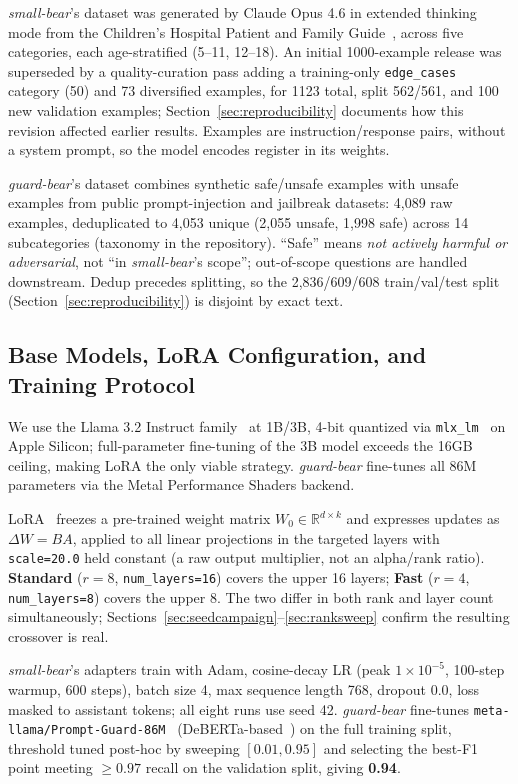 \documentclass[pdflatex,sn-mathphys-num]{sn-jnl-official}%
\begin{document}
\textit{small-bear}'s dataset was generated by Claude Opus 4.6 in extended thinking mode from the Children's Hospital Patient and Family Guide~\cite{hospitalguide}, across five categories, each age-stratified (5--11, 12--18). An initial 1000-example release was superseded by a quality-curation pass adding a training-only \texttt{edge\_cases} category (50) and 73 diversified examples, for 1123 total, split 562/561, and 100 new validation examples; Section~\ref{sec:reproducibility} documents how this revision affected earlier results. Examples are instruction/response pairs, without a system prompt, so the model encodes register in its weights.

\textit{guard-bear}'s dataset combines synthetic safe/unsafe examples with unsafe examples from public prompt-injection and jailbreak datasets: 4{,}089 raw examples, deduplicated to 4{,}053 unique (2{,}055 unsafe, 1{,}998 safe) across 14 subcategories (taxonomy in the repository). ``Safe'' means \textit{not actively harmful or adversarial}, not ``in \textit{small-bear}'s scope''; out-of-scope questions are handled downstream. Dedup precedes splitting, so the 2{,}836/609/608 train/val/test split (Section~\ref{sec:reproducibility}) is disjoint by exact text.

\subsection{Base Models, LoRA Configuration, and Training Protocol}\label{sec:trainprotocol}

We use the Llama 3.2 Instruct family~\cite{dubey2024llama3} at 1B/3B, 4-bit quantized via \texttt{mlx\_lm}~\cite{apple2023mlx} on Apple Silicon; full-parameter fine-tuning of the 3B model exceeds the 16GB ceiling, making LoRA the only viable strategy. \textit{guard-bear} fine-tunes all 86M parameters via the Metal Performance Shaders backend.

LoRA~\cite{hu2022lora} freezes a pre-trained weight matrix $W_0 \in \mathbb{R}^{d\times k}$ and expresses updates as $\Delta W = BA$, applied to all linear projections in the targeted layers with \texttt{scale=20.0} held constant (a raw output multiplier, not an alpha/rank ratio). \textbf{Standard} ($r=8$, \texttt{num\_layers=16}) covers the upper 16 layers; \textbf{Fast} ($r=4$, \texttt{num\_layers=8}) covers the upper 8. The two differ in both rank and layer count simultaneously; Sections~\ref{sec:seedcampaign}--\ref{sec:ranksweep} confirm the resulting crossover is real.

\textit{small-bear}'s adapters train with Adam, cosine-decay LR (peak $1\times10^{-5}$, 100-step warmup, 600 steps), batch size 4, max sequence length 768, dropout 0.0, loss masked to assistant tokens; all eight runs use seed 42. \textit{guard-bear} fine-tunes \texttt{meta-llama/Prompt-Guard-86M}~\cite{promptguard2024} (DeBERTa-based~\cite{he2021deberta}) on the full training split, threshold tuned post-hoc by sweeping $[0.01,0.95]$ and selecting the best-F1 point meeting $\geq 0.97$ recall on the validation split, giving \textbf{0.94}.
\end{document}
